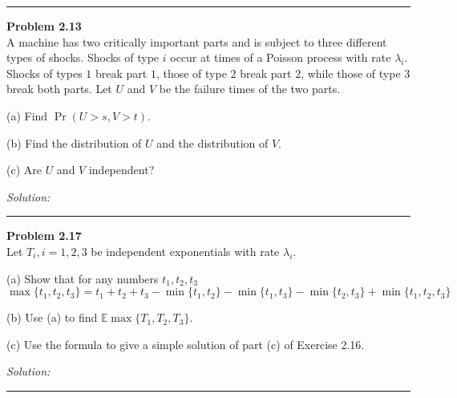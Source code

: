 \documentclass[a4paper, 11pt]{article}
\newenvironment{problem}[2][Problem]
    { \begin{mdframed}[backgroundcolor=gray!20] \textbf{#1 #2} \\}
    {  \end{mdframed}}
\newenvironment{solution}
    {\textit{Solution:}}
    {}
\begin{document}
\noindent\rule{7in}{2.8pt}

\begin{problem}{2.13}
A machine has two critically important parts and is subject to three
different types of shocks. Shocks of type $i$ occur at times of a Poisson process
with rate $\lambda_i$. Shocks of types $1$ break part $1$, those of type $2$ break part $2$,
while those of type $3$ break both parts. Let $U$ and $V$ be the failure times of the
two parts. 

(a) Find $\Pr(U > s, V > t)$. 

(b) Find the distribution of $U$ and the
distribution of $V$. 

(c) Are $U$ and $V$ independent?
\end{problem}

\begin{solution}
	
\end{solution} 

\noindent\rule{7in}{2.8pt}

\begin{problem}{2.17}
Let $T_i, i = 1, 2, 3$ be independent exponentials with rate $\lambda_i$. 

(a) Show
that for any numbers $t_1, t_2, t_3$
$$\max\{t_1, t_2, t_3\} = t_1 + t_2 + t_3 - \min\{t_1, t_2\} - \min\{t_1, t_3\}
- \min\{t_2, t_3\} + \min\{t_1, t_2, t_3\}$$

(b) Use (a) to find $\mathbb{E} \max\{T_1, T_2, T_3\}$. 

(c) Use the formula to give a simple
solution of part (c) of Exercise 2.16.

\end{problem}
\begin{solution}
	
\end{solution} 

\noindent\rule{7in}{2.8pt}
\end{document}
